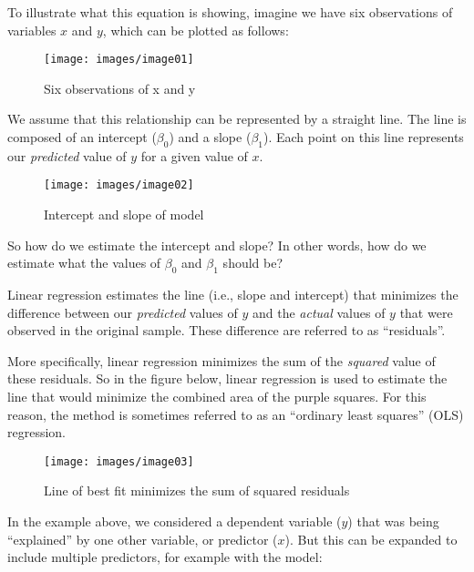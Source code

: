 \documentclass[
  12pt,
]{krantz}
\begin{document}
To illustrate what this equation is showing, imagine we have six observations of variables \(x\) and \(y\), which can be plotted as follows:

\begin{figure}

{\centering \texttt{[image: images/image01]} 

}

\caption{Six observations of x and y}\label{fig:unnamed-chunk-7}
\end{figure}

We assume that this relationship can be represented by a straight line. The line is composed of an intercept (\(\beta_0\)) and a slope (\(\beta_1\)). Each point on this line represents our \emph{predicted} value of \(y\) for a given value of \(x\).

\begin{figure}

{\centering \texttt{[image: images/image02]} 

}

\caption{Intercept and slope of model}\label{fig:unnamed-chunk-8}
\end{figure}

So how do we estimate the intercept and slope? In other words, how do we estimate what the values of \(\beta_0\) and \(\beta_1\) should be?

Linear regression estimates the line (i.e., slope and intercept) that minimizes the difference between our \emph{predicted} values of \(y\) and the \emph{actual} values of \(y\) that were observed in the original sample. These difference are referred to as ``residuals''.

More specifically, linear regression minimizes the sum of the \emph{squared} value of these residuals. So in the figure below, linear regression is used to estimate the line that would minimize the combined area of the purple squares. For this reason, the method is sometimes referred to as an ``ordinary least squares'' (OLS) regression.

\begin{figure}

{\centering \texttt{[image: images/image03]} 

}

\caption{Line of best fit minimizes the sum of squared residuals}\label{fig:unnamed-chunk-9}
\end{figure}

In the example above, we considered a dependent variable (\(y\)) that was being ``explained'' by one other variable, or predictor (\(x\)). But this can be expanded to include multiple predictors, for example with the model:
\end{document}
